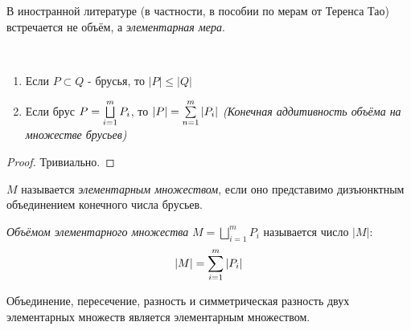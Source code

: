 \begin{anote}
	В иностранной литературе (в частности, в пособии по мерам от Теренса Тао) встречается не объём, а \textit{элементарная мера}.
\end{anote}

\begin{proposition}~
	\begin{enumerate}
		\item Если $P \subset Q$ - брусья, то $|P| \le |Q|$
		
		\item Если брус $P = \bigsqcup\limits_{i = 1}^m P_i$, то $|P| = \sum\limits_{n = 1}^m |P_i|$ \textit{(Конечная аддитивность объёма на множестве брусьев)}
	\end{enumerate}
\end{proposition}

\begin{proof}
	Тривиально.
\end{proof}

\begin{definition}
	$M$ называется \textit{элементарным множеством}, если оно представимо дизъюнктным объединением конечного числа брусьев.
\end{definition}

\begin{definition}
	\textit{Объёмом элементарного множества} $M = \bigsqcup\limits_{i = 1}^m P_i$ называется число $|M|$:
	\[
		|M| = \sum\limits_{i = 1}^m |P_i|
	\]
\end{definition}

\begin{lemma}
	Объединение, пересечение, разность и симметрическая разность двух элементарных множеств является элементарным множеством.
\end{lemma}

\begin{center}
\end{center}

